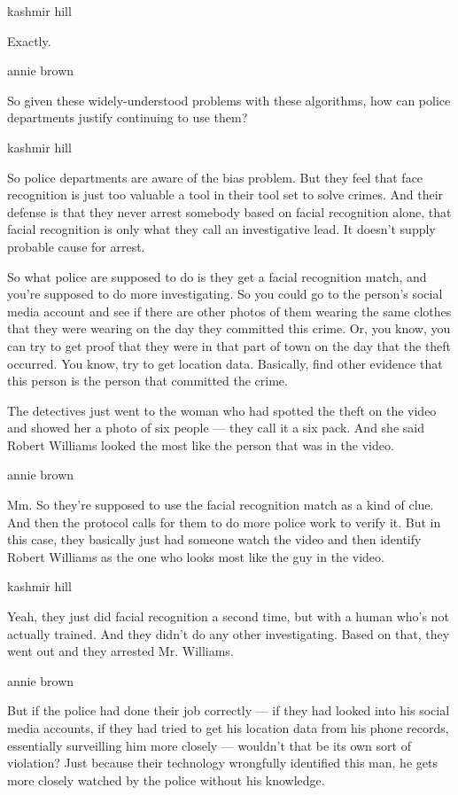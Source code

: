 kashmir hill

Exactly.

annie brown

So given these widely-understood problems with these algorithms, how can
police departments justify continuing to use them?

kashmir hill

So police departments are aware of the bias problem. But they feel that
face recognition is just too valuable a tool in their tool set to solve
crimes. And their defense is that they never arrest somebody based on
facial recognition alone, that facial recognition is only what they call
an investigative lead. It doesn't supply probable cause for arrest.

So what police are supposed to do is they get a facial recognition
match, and you're supposed to do more investigating. So you could go to
the person's social media account and see if there are other photos of
them wearing the same clothes that they were wearing on the day they
committed this crime. Or, you know, you can try to get proof that they
were in that part of town on the day that the theft occurred. You know,
try to get location data. Basically, find other evidence that this
person is the person that committed the crime.

The detectives just went to the woman who had spotted the theft on the
video and showed her a photo of six people --- they call it a six pack.
And she said Robert Williams looked the most like the person that was in
the video.

annie brown

Mm. So they're supposed to use the facial recognition match as a kind of
clue. And then the protocol calls for them to do more police work to
verify it. But in this case, they basically just had someone watch the
video and then identify Robert Williams as the one who looks most like
the guy in the video.

kashmir hill

Yeah, they just did facial recognition a second time, but with a human
who's not actually trained. And they didn't do any other investigating.
Based on that, they went out and they arrested Mr. Williams.

annie brown

But if the police had done their job correctly --- if they had looked
into his social media accounts, if they had tried to get his location
data from his phone records, essentially surveilling him more closely
--- wouldn't that be its own sort of violation? Just because their
technology wrongfully identified this man, he gets more closely watched
by the police without his knowledge.

